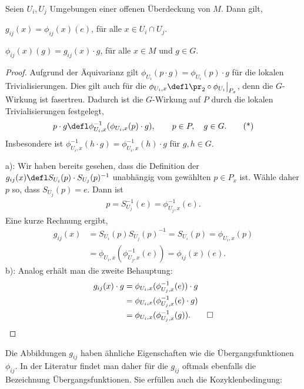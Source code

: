 \documentclass[%
	paper=a5,%
	fleqn,%
	DIV=18,%
	BCOR=0mm,
	fontsize=11pt,
	titlepage=false,%
	bibliography=totoc,
	DIV=18,%
	twoside=true,
	pdftitle=Riemannsche Geometrie,
	pdfauthor=Uwe Semmelmann,
	numbers=noendperiod]%
	{scrbook}
\begin{document}
\begin{lem}
\label{lem:g-phi-relation}
Seien $U_i,U_j$ Umgebungen einer offenen Überdeckung von $M$. Dann
gilt,
\begin{propenum}
\item $g_{ij}(x) = \phi_{ij}(x)(e)$, für alle $x\in U_i\cap U_j$.
\item $\phi_{ij}(x)(g) = g_{ij}(x)\cdot g$, für alle $x\in M$ und $g\in
G$.\fish
\end{propenum}
\end{lem}
\begin{proof}
Aufgrund der Äquivarianz gilt $\phi_{U_i}(p\cdot g) =
\phi_{U_i}(p)\cdot g$ für die lokalen Trivialisierungen. Dies gilt auch für die
$\phi_{U_i,x} \defl \pr_2\circ\phi_{U_i}\big|_{P_x}$, denn die $G$-Wirkung ist
fasertreu. Dadurch ist die $G$-Wirkung auf $P$ durch die lokalen Trivialisierungen
festgelegt,
\begin{align*}
p\cdot g \defl \phi_{U_i,x}^{-1}(\phi_{U_i,x}(p)\cdot g),\qquad p\in P,\quad
g\in G.
 \tag{*}
\end{align*}
Insbesondere ist $\phi_{U_i,x}^{-1}(h\cdot g) =\phi_{U_i,x}^{-1}(h)\cdot g$ für
$g,h\in G$.

a): Wir haben bereits gesehen, dass die Definition der $g_{ij}(x) \defl
S_{U_i}(p)\cdot S_{U_j}(p)^{-1}$ unabhängig vom gewählten $p\in P_x$ ist.
Wähle daher $p$ so, dass $S_{U_j}(p) = e$. Dann ist
\begin{align*}
p = S_{U_j}^{-1}(e) = \phi_{U_j,x}^{-1}(e).
\end{align*}
Eine kurze Rechnung ergibt,
\begin{align*}
g_{ij}(x) &= S_{U_i}(p)S_{U_j}(p)^{-1}
= S_{U_i}(p) = \phi_{U_i,x}(p)\\
&= \phi_{U_i,x}(\phi_{U_j,x}^{-1}(e))
= \phi_{ij}(x)(e).
\end{align*}
b): Analog erhält man die zweite Behauptung:
\begin{align*}
g_{ij}(x)\cdot g &= \phi_{U_i,x}(\phi_{U_j,x}^{-1}(e))\cdot g\\
&= \phi_{U_i,x}(\phi_{U_j,x}^{-1}(e)\cdot g)\\
&= \phi_{U_i,x}(\phi_{U_j,x}^{-1}(g)).\qed
\end{align*}
\end{proof}

Die Abbildungen $g_{ij}$ haben ähnliche Eigenschaften wie die
Übergangsfunktionen $\phi_{ij}$. In der Literatur findet man daher für die
$g_{ij}$ oftmals ebenfalls die Bezeichnung Übergangsfunktionen. Sie erfüllen
auch die Kozyklenbedingung:
\end{document}
